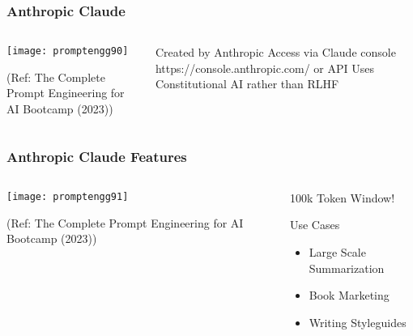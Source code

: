 \begin{frame}[fragile]\frametitle{Anthropic Claude}


\begin{columns}
    \begin{column}[T]{0.6\linewidth}
		\begin{center}
		\texttt{[image: promptengg90]}

		{\tiny (Ref: The Complete Prompt Engineering for AI Bootcamp (2023))}
		\end{center}	
    \end{column}
    \begin{column}[T]{0.4\linewidth}
		Created by Anthropic 
		Access via Claude console https://console.anthropic.com/ or API
		Uses Constitutional AI rather than RLHF
    \end{column}
  \end{columns}
\end{frame}

\begin{frame}[fragile]\frametitle{Anthropic Claude Features}


\begin{columns}
    \begin{column}[T]{0.6\linewidth}
		\begin{center}
		\texttt{[image: promptengg91]}

		{\tiny (Ref: The Complete Prompt Engineering for AI Bootcamp (2023))}
		\end{center}	
    \end{column}
    \begin{column}[T]{0.4\linewidth}
		100k Token Window! 
		
		Use Cases

		\begin{itemize}
		\item Large Scale Summarization
		\item Book Marketing
		\item Writing Styleguides
		\end{itemize}	 
    \end{column}
  \end{columns}
\end{frame}

